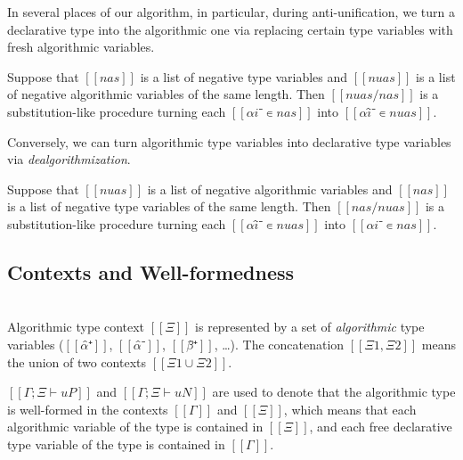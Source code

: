 \documentclass[a4,natbib=false]{article}
\begin{document}
In several places of our algorithm, in particular, during anti-unification,
we turn a declarative type into the algorithmic one
via replacing certain type variables with fresh algorithmic variables.

\begin{definition}
  Suppose that $[[nas]]$ is a list of negative type variables
  and $[[nuas]]$ is a list of negative algorithmic variables of the same length. 
  Then $[[ nuas/nas ]]$ is a substitution-like procedure turning each $[[αi⁻ ∊ {nas}]]$ 
  into $[[αî⁻ ∊ {nuas}]]$.
\end{definition}

Conversely, we can turn algorithmic type variables
into declarative type variables via \emph{dealgorithmization}.

\begin{definition}
  Suppose that $[[nuas]]$ is a list of negative algorithmic variables
  and $[[nas]]$ is a list of negative type variables of the same length. 
  Then $[[ nas/nuas ]]$ is a substitution-like procedure turning each
  $[[αî⁻ ∊ {nuas}]]$ into $[[αi⁻ ∊ {nas}]]$.
\end{definition}


\subsection{Contexts and Well-formedness}

\begin{definition}
  \hfill \\
  Algorithmic type context $[[Ξ]]$ is represented by a set of 
  \emph{algorithmic} type variables ($[[α̂⁺]]$, $[[α̂⁻]]$, $[[β̂⁺]]$, \dots).
  The concatenation $[[Ξ1, Ξ2]]$ means the union of two contexts $[[Ξ1 ∪ Ξ2]]$.
\end{definition}

$[[Γ ; Ξ ⊢ uP]]$ and $[[Γ ; Ξ ⊢ uN]]$ are used to denote
that the algorithmic type is well-formed in the contexts
$[[Γ]]$ and $[[Ξ]]$, which means that each algorithmic variable
of the type is contained in $[[Ξ]]$, and each free declarative type variable
of the type is contained in $[[Γ]]$.

\hfill\\
\ottdefnsWFAT
\end{document}
